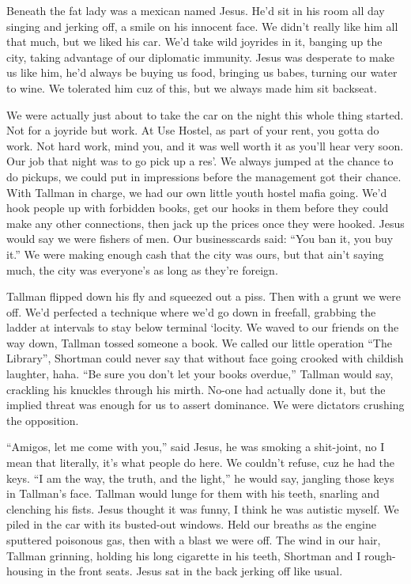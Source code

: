 \documentclass[oneside]{book}
\begin{document}
Beneath the fat lady was a mexican named Jesus.  He'd sit
in his room all day singing and jerking off, a smile on
his innocent face.  We didn't really
like him all that much, but we liked his car.  We'd take wild
joyrides in it, banging up the city, taking advantage of our
diplomatic immunity.  Jesus was desperate to make us like him,
he'd always be buying us food, bringing us babes, turning our
water to wine.  We tolerated him cuz of this, but we always made
him sit backseat.

We were actually just about to take the car on the night this
whole thing started.  Not for a joyride but work.  At Use Hostel,
as part of your rent, you gotta do work.  Not hard work, mind you,
and it was well worth it as you'll hear very soon.  Our job that
night was to go pick up a res'.  We always jumped
at the chance to do pickups, we could put in impressions
before the management got their chance.  With Tallman in charge,
we had our own little youth hostel mafia going.  We'd
hook people up with forbidden books, get our hooks in them before they
could make any other connections, then jack up the prices once they
were hooked.  Jesus would say we were fishers of men.
Our businesscards said:  ``You ban it, you buy it.''
We were making enough cash that the city was ours, but
that ain't saying much, the city was everyone's
as long as they're foreign.

Tallman flipped down his fly and squeezed out a piss.
Then with a grunt we were off.  We'd perfected
a technique where we'd go down in freefall, grabbing the ladder at
intervals to stay below terminal `locity.  We waved to our friends
on the way down, Tallman tossed someone a book.  We called our little
operation ``The Library'', Shortman could never say that without face
going crooked with childish laughter, haha.  ``Be sure you don't let your books
overdue,'' Tallman would say, crackling his knuckles through his
mirth.  No-one had actually done it, but the implied threat was
enough for us to assert dominance.  We were dictators crushing
the opposition.

``Amigos, let me come with you,'' said Jesus, he was smoking a shit-joint,
no I mean that literally, it's what people do here.  We couldn't refuse,
cuz he had the keys.  ``I am the way, the truth, and the light,''
he would say, jangling those keys in Tallman's face.  Tallman
would lunge for them with his teeth, snarling and clenching his fists.
Jesus thought it was funny, I think he was autistic myself.
We piled in the car with its busted-out windows.  Held our breaths as
the engine sputtered poisonous gas, then with a blast we were off.
The wind in our hair, Tallman grinning, holding his long cigarette in
his teeth, Shortman and I rough-housing in the front seats.  Jesus sat
in the back jerking off like usual.
\end{document}

